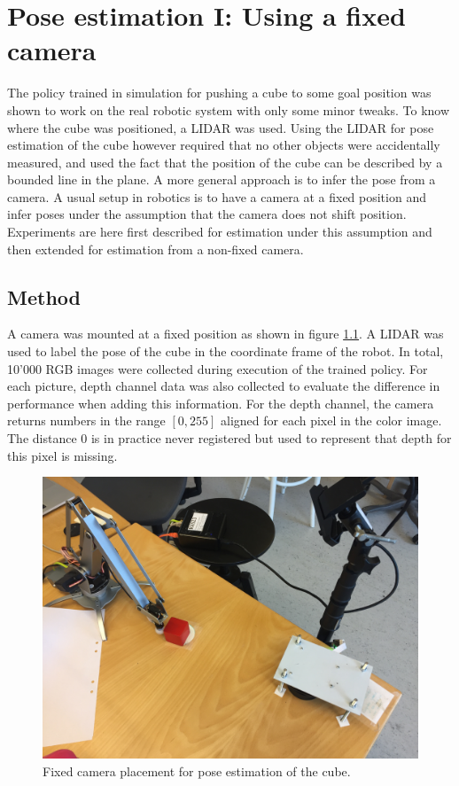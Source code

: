 \chapter{Pose estimation I: Using a fixed camera}

The policy trained in simulation for pushing a cube to some goal position was
shown to work on the real robotic system with only some minor tweaks.  To know
where the cube was positioned, a LIDAR was used.  Using the LIDAR for pose
estimation of the cube however required that no other objects were accidentally
measured, and used the fact that the position of the cube can be described by a
bounded line in the plane. A more general approach is to infer the pose from a
camera. A usual setup in robotics is to have a camera at a fixed position and
infer poses under the assumption that the camera does not shift position.
Experiments are here first described for estimation under this assumption and
then extended for estimation from a non-fixed camera.

\section{Method}

A camera was mounted at a fixed position as shown in figure
\ref{fig:camera_placement_fixed}. A LIDAR was used to label the pose of the
cube in the coordinate frame of the robot. In total, 10'000 RGB images were
collected during execution of the trained policy. For each picture, depth
channel data was also collected to evaluate the difference in performance when
adding this information. For the depth channel, the camera returns numbers in
the range $[0, 255]$ aligned for each pixel in the color image. The distance
$0$ is in practice never registered but used to represent that depth for this
pixel is missing.

\begin{figure}[h!]
    \centering
    \includegraphics[width=0.4 \textwidth]{res/camera_placement_fixed.jpg}

    \caption{Fixed camera placement for pose estimation of the cube.}

    \label{fig:camera_placement_fixed}
    
\end{figure}

